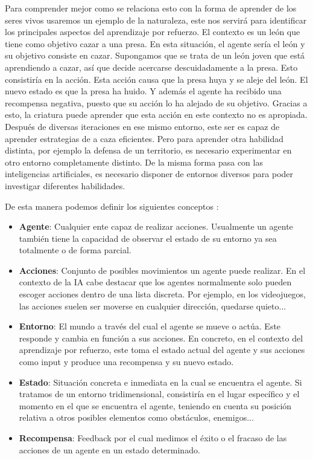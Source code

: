 Para comprender mejor como se relaciona esto con la forma de aprender de los seres vivos usaremos un ejemplo de la naturaleza, este nos servirá para identificar los principales aspectos del aprendizaje por refuerzo. El contexto es un león que tiene como objetivo cazar a una presa. En esta situación, el agente sería el león y su objetivo consiste en cazar. Supongamos que se trata de un león joven que está aprendiendo a cazar, así que decide acercarse descuidadamente a la presa. Esto consistiría en la acción. Esta acción causa que la presa huya y se aleje del león. El nuevo estado es que la presa ha huido. Y además el agente ha recibido una recompensa negativa, puesto que su acción lo ha alejado de su objetivo. Gracias a esto, la criatura puede aprender que esta acción en este contexto no es apropiada. Después de diversas iteraciones en ese mismo entorno, este ser es capaz de aprender estrategias de a caza eficientes. Pero para aprender otra habilidad distinta, por ejemplo la defensa de un territorio, es necesario experimentar en otro entorno completamente distinto. De la misma forma pasa con las inteligencias artificiales, es necesario disponer de entornos diversos para poder investigar diferentes habilidades.  

De esta manera podemos definir los siguientes conceptos \cite  {wiki_path}:
\begin{itemize}
	\item \textbf{Agente}: Cualquier ente capaz de realizar acciones. Usualmente un agente también tiene la capacidad de observar el estado de su entorno ya sea totalmente o de forma parcial.
	\item \textbf{Acciones}: Conjunto de posibles movimientos un agente puede realizar. En el contexto de la IA cabe destacar que los agentes normalmente solo pueden escoger acciones dentro de una lista discreta. Por ejemplo, en los videojuegos, las acciones suelen ser moverse en cualquier dirección, quedarse quieto...
	\item \textbf{Entorno}: El mundo a través del cual el agente se mueve o actúa. Este responde y cambia en función a sus acciones. En concreto, en el contexto del aprendizaje por refuerzo, este toma el estado actual del agente y sus acciones como input y produce una recompensa y su nuevo estado.
	\item \textbf{Estado}: Situación concreta e inmediata en la cual se encuentra el agente. Si tratamos de un entorno tridimensional, consistiría en el lugar específico y el momento en el que se encuentra el agente, teniendo en cuenta su posición relativa a otros posibles elementos como obstáculos, enemigos...
	\item \textbf{Recompensa}: Feedback por el cual medimos el éxito o el fracaso de las acciones de un agente en un estado determinado.  
\end{itemize}

